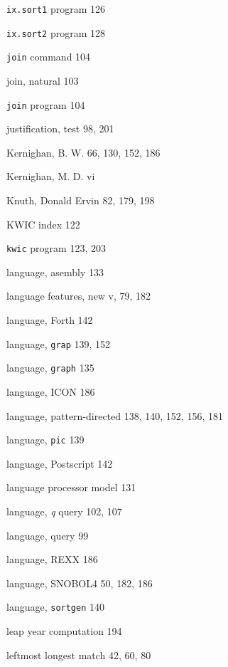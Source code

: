 \begin{multicols}{3}
\verb'ix.sort1' program 126

\verb'ix.sort2' program 128 

\verb'join' command 104

join, natural 103

\verb'join' program 104

justification, test 98, 201

Kernighan, B. W. 66, 130, 152, 186

Kernighan, M. D. vi 

Knuth, Donald Ervin 82, 179, 198

KWIC index 122

\verb'kwic' program 123, 203

language, asembly 133

language features, new v, 79, 182

language, Forth 142

language, \verb'grap' 139, 152

language, \verb'graph' 135

language, ICON 186

language, pattern-directed 138, 140, 152, 156, 181

language, \verb'pic' 139

language, Postscript 142

language processor model 131

language, \textit{q} query 102, 107

language, query 99

language, REXX 186

language, SNOBOL4 50, 182, 186

language, \verb'sortgen' 140

leap year computation 194

leftmost longest match 42, 60, 80
\end{multicols}
